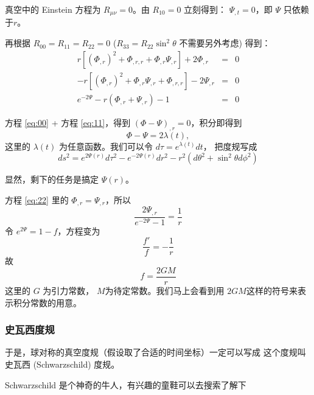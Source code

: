 \documentclass[CJK,13pt]{beamer}
\begin{document}
  
  \begin{frame}
    真空中的  Einstein 方程为 $R_{\mu\nu}=0$。由 $R_{10}=0$ 立刻得到： $\Psi_{,t}=0$，即 $\Psi$ 只依赖于$r$。

    再根据 $R_{00}= R_{11}= R_{22}=0$ ($R_{33}=R_{22}\sin^2\theta$ 不需要另外考虑) 得到：
    \begin{eqnarray}
r\left[\left(\Phi_{,r}\right)^{2} +  \Phi_{,r,r}+ \Phi_{,r} \Psi_{, r}  \right] +  2\Phi_{,r}&=& 0 \label{eq:00}\\
-r \left[\left(\Phi_{,r}\right)^{2} + \Phi_{,r} \Psi_{, r} + \Phi_{,r,r}\right] - 2 \Psi_{, r} &=&0 \label{eq:11} \\
e^{-2 \Psi}- r \left(\Phi_{,r} + \Psi_{, r}\right)  - 1  &=& 0 \label{eq:22}
    \end{eqnarray}
  \end{frame}

  \begin{frame}
方程 \eqref{eq:00} + 方程 \eqref{eq:11}，得到 $(\Phi - \Psi)_{,r}=0$，积分即得到
\begin{equation}
  \Phi - \Psi = 2\lambda(t), \nonumber
\end{equation}
这里的 $\lambda(t)$ 为任意函数。我们可以令 $d\tau =e^{\lambda(t)}dt$， 把度规写成
{\blue $$ ds^2 = e^{2\Psi(r)} d\tau^2 - e^{-2\Psi(r)} dr^2 - r^2(d\theta^2+\sin^2\theta d\phi^2)$$}

\skipline

显然，剩下的任务是搞定 $\Psi(r)$。
  \end{frame}

  \begin{frame}
    方程 \eqref{eq:22} 里的 $\Phi_{,r} = \Psi_{,r}$，所以
    $$\frac{2\Psi_{,r}}{e^{-2\Psi}-1} = \frac{1}{r}$$
    令 $e^{2\Psi}= 1- f$，方程变为
    $$\frac{f'}{f} = -\frac{1}{r}$$
    故
    $$  f = \frac{2GM}{r}$$
    这里的 $G$ 为引力常数， $M$为待定常数。我们马上会看到用 $2GM$这样的符号来表示积分常数的用意。
  \end{frame}

  \begin{frame}
    \frametitle{史瓦西度规}
    
    于是，球对称的真空度规（假设取了合适的时间坐标）一定可以写成
    这个度规叫史瓦西 (Schwarzschild) 度规。


    \emini
          {\small Schwarzschild 是个神奇的牛人，有兴趣的童鞋可以去搜索了解下}
    \emini

  \end{frame}
\end{document}
